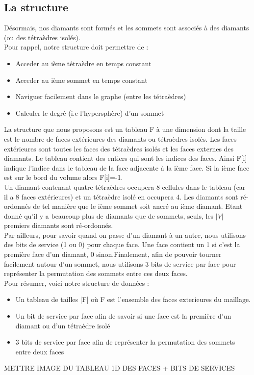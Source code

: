\documentclass[a4paper,11pt,openany]{article}
\begin{document}
\subsection{La structure}
Désormais, nos diamants sont formés et les sommets sont associés à des diamants (ou des tétraèdres isolés).\\
Pour rappel, notre structure doit permettre de :
\begin{itemize}
\item Acceder au ième tétraèdre en temps constant
\item Acceder au ième sommet en temps constant
\item Naviguer facilement dans le graphe (entre les tétraèdres)
\item Calculer le degré (i.e l'hypersphère) d'un sommet
\end{itemize}
La structure que nous proposons est un tableau F à une dimension dont la taille est le nombre de faces extérieures des diamants ou tétraèdres isolés. Les faces extérieures sont toutes les faces des tétraèdres isolés et les faces externes des diamants. Le tableau contient des entiers qui sont les indices des faces. Ainsi F[i] indique l'indice dans le tableau de la face adjacente à la ième face. Si la ième face est sur le bord du volume alors F[i]=-1.\\ 
Un diamant contenant quatre tétraèdres occupera 8 cellules dans le tableau (car il a 8 faces extérieures) et un tétraèdre isolé en occupera 4. Les diamants sont ré-ordonnés de tel manière que le ième sommet soit ancré au ième diamant. Etant donné qu'il y a beaucoup plus de diamants que de sommets, seuls, les $|V|$ premiers diamants sont ré-ordonnés.\\
Par ailleurs, pour savoir quand on passe d'un diamant à un autre, nous utilisons des bits de service (1 ou 0) pour chaque face. Une face contient un 1 si c'est la première face d'un diamant, 0 sinon.Finalement, afin de pouvoir tourner facilement autour d'un sommet, nous utilisons 3 bits de service par face pour représenter la permutation des sommets entre ces deux faces.\\
Pour résumer, voici notre structure de données :
\begin{itemize}
\item Un tableau de tailles |F| où F est l'ensemble des faces exterieures du maillage.
\item Un bit de service par face afin de savoir si une face est la première d'un diamant ou d'un tétraèdre isolé
\item 3 bits de service par face afin de représenter la permutation des sommets entre deux faces
\end{itemize}
METTRE IMAGE DU TABLEAU 1D DES FACES + BITS DE SERVICES
\end{document}
